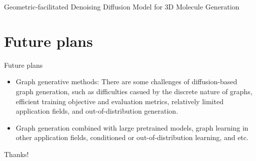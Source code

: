 \documentclass{beamer}
\begin{document}
\begin{frame}{Geometric-facilitated Denoising Diffusion Model for 3D Molecule Generation}
    \begin{figure}[H]
        \centering
        \hspace{0mm}
        \label{gen_illustration}
    \end{figure}
\end{frame}

\section{Future plans}
\begin{frame}{Future plans}
    \begin{itemize}
        \item Graph generative methods: There are some challenges of diffusion-based graph generation, such as difficulties casued by the discrete nature of graphs, efficient training objective and evaluation metrics, relatively limited application fields, and out-of-distribution generation.
        \item Graph generation combined with large pretrained models, graph learning in other application fields, conditioned or out-of-distribution learning, and etc.
    \end{itemize}
\end{frame}


\begin{frame}
    \begin{center}
        {\Huge\calligra Thanks!}
    \end{center}
\end{frame}
\end{document}
